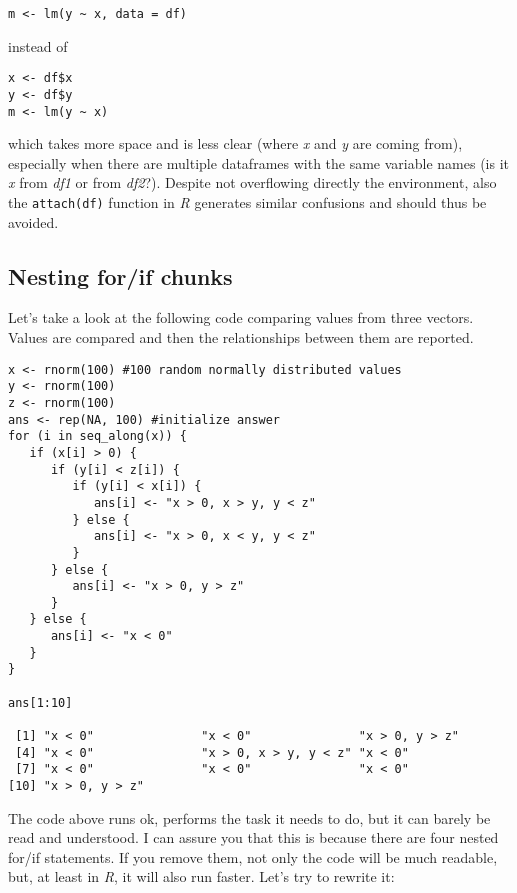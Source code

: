\documentclass{book}
\begin{document}
\begin{lstlisting}[showstringspaces=false]
m <- lm(y ~ x, data = df)
\end{lstlisting}

instead of 

\begin{lstlisting}[showstringspaces=false]
x <- df$x
y <- df$y
m <- lm(y ~ x)
\end{lstlisting}

which takes more space and is less clear (where \textit{x} and \textit{y} are coming from), especially when there are multiple dataframes with the same variable names (is it \textit{x} from \textit{df1} or from \textit{df2}?). Despite not overflowing directly the environment, also the \texttt{attach(df)} function in \textit{R} generates similar confusions and should thus be avoided.

\subsection{Nesting for/if chunks}
Let's take a look at the following code comparing values from three vectors. Values are compared and then the relationships between them are reported.

\begin{lstlisting}[showstringspaces=false]
x <- rnorm(100) #100 random normally distributed values
y <- rnorm(100)
z <- rnorm(100)
ans <- rep(NA, 100) #initialize answer
for (i in seq_along(x)) {
   if (x[i] > 0) {
      if (y[i] < z[i]) {
         if (y[i] < x[i]) {
            ans[i] <- "x > 0, x > y, y < z"
         } else {
            ans[i] <- "x > 0, x < y, y < z"
         }
      } else {
         ans[i] <- "x > 0, y > z"
      }
   } else {
      ans[i] <- "x < 0"
   }
}

ans[1:10]

 [1] "x < 0"               "x < 0"               "x > 0, y > z"       
 [4] "x < 0"               "x > 0, x > y, y < z" "x < 0"              
 [7] "x < 0"               "x < 0"               "x < 0"              
[10] "x > 0, y > z"   
\end{lstlisting}

The code above runs ok, performs the task it needs to do, but it can barely be read and understood. I can assure you that this is because there are four nested for/if statements. If you remove them, not only the code will be much readable, but, at least in \textit{R}, it will also run faster. Let's try to rewrite it:
\end{document}
